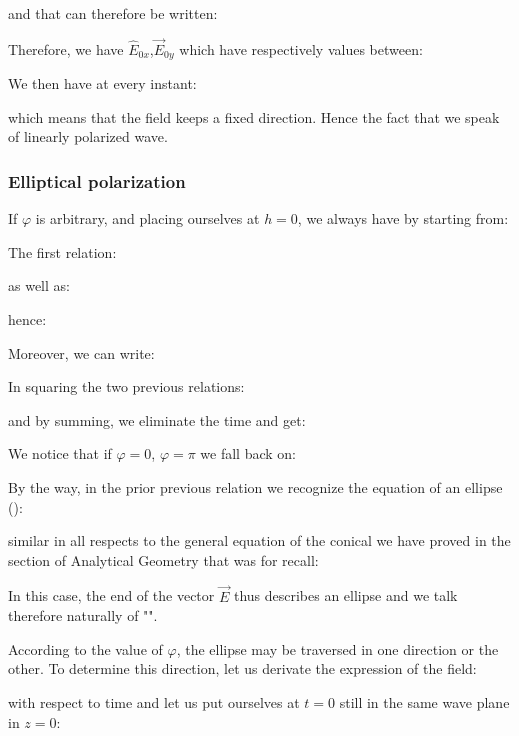 	and that can therefore be written:
	
	Therefore, we have $\hat{E}_{0x}$,$\vec{E}_{0y}$ which have respectively values between:
	
	We then have at every instant:
	
	which means that the field keeps a fixed direction. Hence the fact that we speak of linearly polarized wave.
	
	\subsubsection{Elliptical polarization}
	If $\varphi$ is arbitrary, and placing ourselves at $h=0$, we always have by starting from:
	
	The first relation:
	
	as well as:
	
	hence:
	
	Moreover, we can write:
	
	In squaring the two previous relations:
	
	and by summing, we eliminate the time and get:
	
	
	We notice that if $\varphi=0$, $\varphi=\pi$ we fall back on:
	
	By the way, in the prior previous relation we recognize the equation of an ellipse ():
	
	similar in all respects to the general equation of the conical we have proved in the section of Analytical Geometry that was for recall:
	
	In this case, the end of the vector $\vec{E}$ thus describes an ellipse and we talk therefore naturally of "".

	According to the value of $\varphi$, the ellipse may be traversed in one direction or the other. To determine this direction, let us derivate the expression of the field:
	
	with respect to time and let us put ourselves at $t=0$ still in the same wave plane in $z=0$:
	

